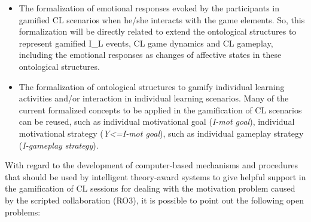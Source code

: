 \begin{itemize}
\item The formalization of emotional responses evoked by the participants in gamified CL scenarios when he/she interacts with the game elements. So, this formalization will be directly related to extend the ontological structures to represent gamified I\_L events, CL game dynamics and CL gameplay, including the emotional responses as changes of affective states in these ontological structures.
\item The formalization of ontological structures to gamify individual learning activities and/or interaction in individual learning scenarios. Many of the current formalized concepts to be applied in the gamification of CL scenarios can be reused, such as individual motivational goal (\emph{I-mot goal}), individual motivational strategy (\emph{Y<=I-mot goal}), such as individual gameplay strategy (\emph{I-gameplay strategy}).
\end{itemize}

With regard to the development of computer-based mechanisms and procedures that should be used by intelligent theory-award systems to give helpful support in the gamification of CL sessions for dealing with the motivation problem caused by the scripted collaboration (RO3), it is possible to point out the following open problems:

